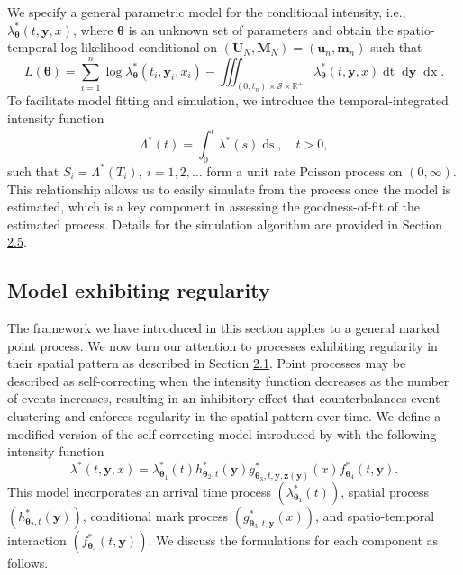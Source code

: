 We specify a general parametric model for the conditional intensity,
i.e., \(\lambda^*_{\boldsymbol{\theta}}(t, \boldsymbol{y}, x)\), where
\(\boldsymbol{\theta}\) is an unknown set of parameters and obtain the
spatio-temporal log-likelihood conditional on
\((\boldsymbol{U}_N, \boldsymbol{M}_N) = (\boldsymbol{u}_n, \boldsymbol{m}_n)\)
such that
\[
L(\boldsymbol{\theta}) = \sum_{i=1}^n \log \lambda^*_{\boldsymbol{\theta}}(t_i, \boldsymbol{y}_i, x_i) - \iiint_{(0, t_n) \times \mathscr{S} \times \mathbb{R}^+}  \lambda^*_{\boldsymbol{\theta}}(t, \boldsymbol{y}, x) \mathop{dt}\mathop{d\boldsymbol{y}}\mathop {dx}.
\]
To facilitate model fitting and simulation, we introduce the
temporal-integrated intensity function
\begin{equation}
\Lambda^*(t) = \int_{0}^t \lambda^*(s) \mathop{ds}, \quad t > 0,
  \label{eq:temporalintegratedintensity}
\end{equation}
such that \(S_i = \Lambda^*(T_i), \ i = 1,2,\dots\) form a
unit rate Poisson process on \((0, \infty)\). This relationship allows us
to easily simulate from the process once the model is estimated, which
is a key component in assessing the goodness-of-fit of the estimated
process. Details for the simulation algorithm are provided in Section \hyperref[simulation]{2.5}.

\subsection{Model exhibiting regularity}\label{selfcorrecting}

The framework we have introduced in this section applies to a general
marked point process. We now turn our attention to processes exhibiting
regularity in their spatial pattern as described in Section \hyperref[mpp]{2.1}.
Point processes may be described as self-correcting when the intensity
function decreases as the number of events increases, resulting in an
inhibitory effect that counterbalances event clustering and enforces
regularity in the spatial pattern over time. We define a modified
version of the self-correcting model introduced by
\citet{ishamSelfcorrectingPointProcess1979} with the following intensity
function \[
\lambda^*(t, \boldsymbol{y}, x) = \lambda_{\boldsymbol{\theta}_1}^*(t) h_{\boldsymbol{\theta}_2, t}^*(\boldsymbol{y}) g_{\boldsymbol{\theta}_3, t, \boldsymbol{y}, \boldsymbol{z}(\boldsymbol{y})}^*(x) f_{\boldsymbol{\theta}_4}^*(t, \boldsymbol{y}).
\] This model incorporates an arrival time process
\((\lambda_{\boldsymbol{\theta}_1}^*(t))\), spatial process
\((h_{\boldsymbol{\theta}_2, t}^*(\boldsymbol{y}))\), conditional mark
process \((g_{\boldsymbol{\theta}_3, t, \boldsymbol{y}}^*(x))\), and
spatio-temporal interaction
\((f_{\boldsymbol{\theta}_4}^*(t, \boldsymbol{y}))\). We discuss the
formulations for each component as follows.

